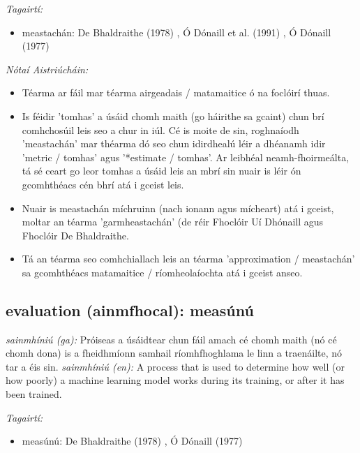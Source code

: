 \documentclass{article}
\begin{document}
 \noindent \textit{Tagairtí:}
\begin{itemize}
	\item meastachán: De Bhaldraithe (1978) \cite{de-bhaldraithe}, Ó Dónaill et al. (1991) \cite{focloir-beag}, Ó Dónaill (1977) \cite{odonaill}
\end{itemize}

 \noindent \textit{Nótaí Aistriúcháin:}
\begin{itemize}
	\item Téarma ar fáil mar téarma airgeadais / matamaitice ó na foclóirí thuas.
	\item Is féidir 'tomhas' a úsáid chomh maith (go háirithe sa gcaint) chun brí comhchosúil leis seo a chur in iúl. Cé is moite de sin, roghnaíodh 'meastachán' mar théarma dó seo chun idirdhealú léir a dhéanamh idir 'metric / tomhas' agus '*estimate / tomhas'. Ar leibhéal neamh-fhoirmeálta, tá sé ceart go leor tomhas a úsáid leis an mbrí sin nuair is léir ón gcomhthéacs cén bhrí atá i gceist leis.
	\item Nuair is meastachán míchruinn (nach ionann agus mícheart) atá i gceist, moltar an téarma 'garmheastachán' (de réir Fhoclóir Uí Dhónaill agus Fhoclóir De  Bhaldraithe.
	\item Tá an téarma seo comhchiallach leis an téarma 'approximation / meastachán' sa gcomhthéacs matamaitice / ríomheolaíochta atá i gceist anseo.
\end{itemize}


\subsection*{evaluation (ainmfhocal): measúnú} 
 \noindent \textit{sainmhíniú (ga):} Próiseas a úsáidtear chun fáil amach cé chomh maith (nó cé chomh dona) is a fheidhmíonn samhail ríomhfhoghlama le linn a traenáilte, nó tar a éis sin.
\newline\newline
 \noindent \textit{sainmhíniú (en):} A process that is used to determine how well (or how poorly) a machine learning model works during its training, or after it has been trained.
\newline

 \noindent \textit{Tagairtí:}
\begin{itemize}
	\item measúnú: De Bhaldraithe (1978) \cite{de-bhaldraithe}, Ó Dónaill (1977) \cite{odonaill}
\end{itemize}
\end{document}
